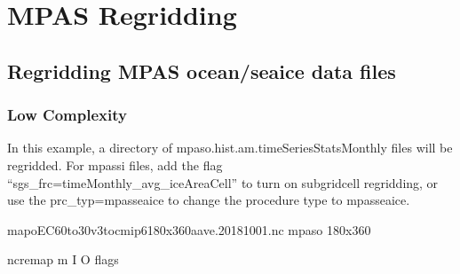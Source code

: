 \documentclass[letterpaper,10pt,english]{sphinxmanual}
\begin{document}
\chapter{MPAS Regridding}
\label{\detokenize{mpas_regrid:mpas-regridding}}\label{\detokenize{mpas_regrid:id1}}\label{\detokenize{mpas_regrid::doc}}

\section{Regridding MPAS ocean/sea\sphinxhyphen{}ice data files}
\label{\detokenize{mpas_regrid:regridding-mpas-ocean-sea-ice-data-files}}

\subsection{Low Complexity}
\label{\detokenize{mpas_regrid:low-complexity}}
In this example, a directory of mpaso.hist.am.timeSeriesStatsMonthly files will be regridded.
For mpassi files, add the flag “\textendash{}sgs\_frc=timeMonthly\_avg\_iceAreaCell” to turn on sub\sphinxhyphen{}grid\sphinxhyphen{}cell regridding,
or use the \textendash{}prc\_typ=mpasseaice to change the procedure type to mpas\sphinxhyphen{}sea\sphinxhyphen{}ice.

\begin{sphinxVerbatim}[commandchars=\\\{\}]
map\PYGZus{}oEC60to30v3\PYGZus{}to\PYGZus{}cmip6\PYGZus{}180x360\PYGZus{}aave.20181001.nc   
mpaso                                                
180x360                                             
                                

ncremap \PYGZhy{}m  \PYGZhy{}I  \PYGZhy{}O  flags
\end{sphinxVerbatim}
\end{document}
